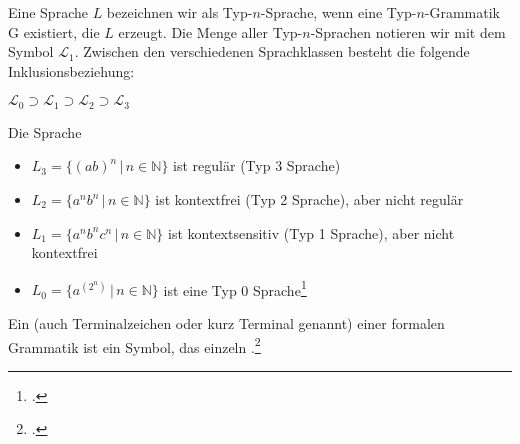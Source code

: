 \documentclass{lehramt-informatik-haupt}
\begin{document}

Eine Sprache $L$ bezeichnen wir als Typ-$n$-Sprache, wenn eine
Typ-$n$-Grammatik G existiert, die $L$ erzeugt. Die Menge aller
Typ-$n$-Sprachen notieren wir mit dem Symbol $\mathcal{L}_1$. Zwischen
den verschiedenen Sprachklassen besteht die folgende
Inklusionsbeziehung:

$\mathcal{L}_0 \supset \mathcal{L}_1 \supset \mathcal{L}_2 \supset \mathcal{L}_3$

%

\noindent
Die Sprache

\begin{itemize}
\item $L_3 = \{(ab)^n \, | \, n \in \mathbb{N}\}$
ist regulär (Typ 3 Sprache)

\item $L_2 = \{a^n b^n \, | \, n \in \mathbb{N}\}$
ist kontextfrei (Typ 2 Sprache), aber nicht regulär

\item $L_1 = \{a^n b^n c^n \, | \, n \in \mathbb{N}\}$
ist kontextsensitiv (Typ 1 Sprache), aber nicht kontextfrei

\item $L_0 = \{a^{(2^n)}\, | \, n \in \mathbb{N}\}$
ist eine Typ 0 Sprache\footcite[Seite 15]{theo:fs:1}
\end{itemize}

%

Ein  (auch Terminalzeichen oder kurz Terminal
genannt) einer formalen Grammatik ist ein Symbol, das einzeln
.\footcite{wiki:terminal}
\end{document}
